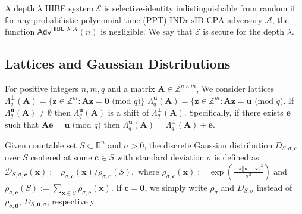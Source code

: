 \documentclass[runningheads]{llncs}
\begin{document}
\begin{definition} A depth $\lambda$  HIBE system $\mathcal{E}$ is selective-identity indistinguishable from random if for any   probabilistic polynomial time (PPT) $\text{INDr-sID-CPA}$ adversary $\mathcal{A}$, the function $\mathsf{Adv}^{\mathsf{HIBE}, \lambda,\mathcal{A}}(n)$ is negligible. We say that  $\mathcal{E}$ is secure for 
the depth $\lambda$.
\end{definition}



\subsection{Lattices and Gaussian Distributions} \label{lattice}
 For positive integers $n, m, q$ and a matrix $\mathbf{A} \in \mathbb{Z}^{n \times m}$, 
We consider lattices 
  $  \Lambda_q^{\bot}(\mathbf{A})=\{\mathbf{z} \in \mathbb{Z}^m: \mathbf{A}\mathbf{z}=\mathbf{0} \text{ (mod } q) \}$
  $   \Lambda_q^{\mathbf{u}}(\mathbf{A})=\{\mathbf{z} \in \mathbb{Z}^m: \mathbf{A}\mathbf{z}=\mathbf{u} \text{ (mod } q) .$
If $\Lambda_q^{\mathbf{u}}(\mathbf{A}) \neq \emptyset$ then $\Lambda_q^{\mathbf{u}}(\mathbf{A})$ is a shift of $\Lambda_q^{\bot}(\mathbf{A})$. Specifically, if there exists $\mathbf{e}$ such that $\mathbf{A}\mathbf{e}=\mathbf{u} \mbox{ (mod } q)$ then $\Lambda_q^{\mathbf{u}}(\mathbf{A})=\Lambda_q^{\bot}(\mathbf{A})+\mathbf{e}.$

\begin{definition}  Given countable set $S \subset \mathbb{R}^n$ and $\sigma>0$, the discrete Gaussian distribution $D_{S,\sigma,\mathbf{c}}$ over $S$ centered at some $\mathbf{c} \in S$ with standard deviation $\sigma$ is defined as $\mathcal{D}_{S, \sigma,\mathbf{c}}(\mathbf{x}):=\rho_{\sigma,\mathbf{c} }(\mathbf{x})/\rho_{\sigma,\mathbf{c} }(S),$ where $\rho_{ \sigma,\mathbf{c}}(\mathbf{x}):=\exp(\frac{-\pi \Vert \mathbf{x}-\mathbf{v}\Vert^2 }{\sigma^2})$ and $\rho_{\sigma,\mathbf{c}}(S):=\sum_{\mathbf{x}\in S}\rho_{\sigma,\mathbf{c}}(\mathbf{x})$. If $\mathbf{c}=\mathbf{0}$, we simply write $\rho_{\sigma}$ and $D_{S, \sigma}$ instead of $\rho_{\sigma,\mathbf{0}}$, $D_{S, \mathbf{0}, \sigma}$, respectively.
	
\end{definition}
\end{document}
